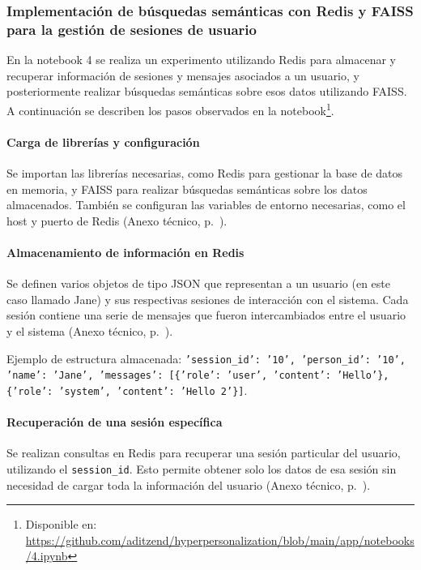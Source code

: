 \subsubsection{Implementación de búsquedas semánticas con Redis y FAISS para la gestión de sesiones de usuario}

En la notebook 4 se realiza un experimento utilizando Redis para almacenar y recuperar información de sesiones y mensajes asociados a un usuario, y posteriormente realizar búsquedas semánticas sobre esos datos utilizando FAISS. A continuación se describen los pasos observados en la notebook\footnote{Disponible en: \url{https://github.com/aditzend/hyperpersonalization/blob/main/app/notebooks/4.ipynb}}.

\paragraph{Carga de librerías y configuración}

Se importan las librerías necesarias, como Redis para gestionar la base de datos en memoria, y FAISS para realizar búsquedas semánticas sobre los datos almacenados. También se configuran las variables de entorno necesarias, como el host y puerto de Redis (Anexo técnico, p.~\pageref{anexo:code-4-1-4-1}).

\paragraph{Almacenamiento de información en Redis}

Se definen varios objetos de tipo JSON que representan a un usuario (en este caso llamado Jane) y sus respectivas sesiones de interacción con el sistema. Cada sesión contiene una serie de mensajes que fueron intercambiados entre el usuario y el sistema (Anexo técnico, p.~\pageref{anexo:code-4-1-4-2}).

Ejemplo de estructura almacenada: \texttt{'session\_id': '10', 'person\_id': '10', 'name': 'Jane', 'messages': [\{'role': 'user', 'content': 'Hello'\}, \{'role': 'system', 'content': 'Hello 2'\}]}.

\paragraph{Recuperación de una sesión específica}

Se realizan consultas en Redis para recuperar una sesión particular del usuario, utilizando el \texttt{session\_id}. Esto permite obtener solo los datos de esa sesión sin necesidad de cargar toda la información del usuario (Anexo técnico, p.~\pageref{anexo:code-4-1-4-3}).

